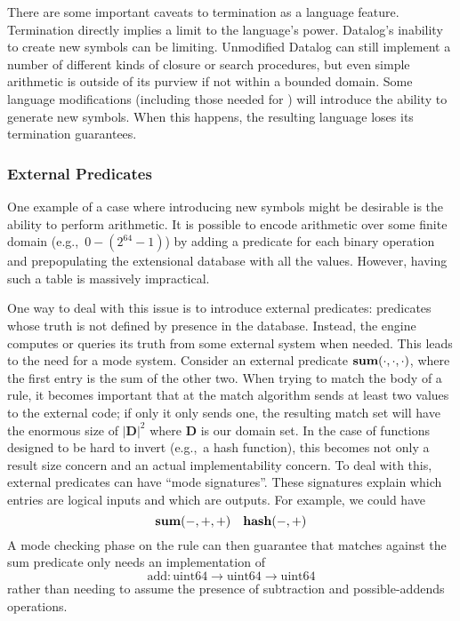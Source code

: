 There are some important caveats to termination as a language feature.
%
Termination directly implies a limit to the language's power.
Datalog's inability to create new symbols can be limiting.
Unmodified Datalog can still implement a number of different kinds of closure or search procedures, but even simple arithmetic is outside of its purview if not within a bounded domain.
%
Some language modifications (including those needed for \sysname) will introduce the ability to generate new symbols.
When this happens, the resulting language loses its termination guarantees.
\subsubsection{External Predicates}
\label{sec:extpred}
One example of a case where introducing new symbols might be desirable is the ability to perform arithmetic.
It is possible to encode arithmetic over some finite domain (e.g.,\ $0-(2^{64} - 1)$) by adding a predicate for each binary operation and prepopulating the extensional database with all the values.
However, having such a table is massively impractical.

One way to deal with this issue is to introduce external predicates: predicates whose truth is not defined by presence in the database.
Instead, the engine computes or queries its truth from some external system when needed.
This leads to the need for a mode system.
Consider an external predicate ${\bf sum}(\cdot, \cdot, \cdot)$, where the first entry is the sum of the other two.
When trying to match the body of a rule, it becomes important that at the match algorithm sends at least two values to the external code; if only it only sends one, the resulting match set will have the enormous size of $|\mathbf{D}|^2$ where $\mathbf{D}$ is our domain set.
In the case of functions designed to be hard to invert (e.g.,\ a hash function), this becomes not only a result size concern and an actual implementability concern.
To deal with this, external predicates can have ``mode signatures''.
These signatures explain which entries are logical inputs and which are outputs.
For example, we could have
\[
        {\bf sum}(-, +, +) \quad {\bf hash}(-, +)
\]
A mode checking phase on the rule can then guarantee that matches against the sum predicate only needs an implementation of
\[
        \textrm{add} : \textrm{uint64} \rightarrow \textrm{uint64} \rightarrow \textrm{uint64}
\]
rather than needing to assume the presence of subtraction and possible-addends operations.

